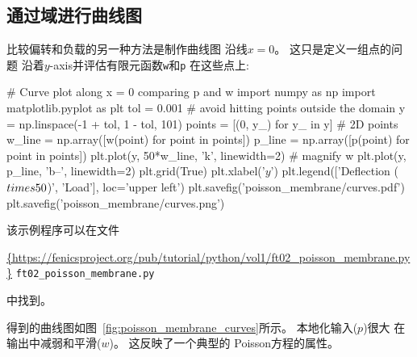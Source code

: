 \subsection{通过域进行曲线图}


比较偏转和负载的另一种方法是制作曲线图
沿线$x=0$。 这只是定义一组点的问题
沿着$y$-axis并评估有限元函数\texttt{w}和\texttt{p}
在这些点上:

\begin{python}
# Curve plot along x = 0 comparing p and w
import numpy as np
import matplotlib.pyplot as plt
tol = 0.001  # avoid hitting points outside the domain
y = np.linspace(-1 + tol, 1 - tol, 101)
points = [(0, y_) for y_ in y]  # 2D points
w_line = np.array([w(point) for point in points])
p_line = np.array([p(point) for point in points])
plt.plot(y, 50*w_line, 'k', linewidth=2)  # magnify w
plt.plot(y, p_line, 'b--', linewidth=2)
plt.grid(True)
plt.xlabel('$y$')
plt.legend(['Deflection ($\\times 50$)', 'Load'], loc='upper left')
plt.savefig('poisson_membrane/curves.pdf')
plt.savefig('poisson_membrane/curves.png')
\end{python}
该示例程序可以在文件
\begin{center}
  \url{{https://fenicsproject.org/pub/tutorial/python/vol1/ft02_poisson_membrane.py}} {\nolinkurl {ft02_poisson_membrane.py}}
\end{center}
中找到。

得到的曲线图如图~\ref{fig:poisson_membrane_curves}所示。 本地化输入($p$)很大
在输出中减弱和平滑($w$)。 这反映了一个典型的
Poisson方程的属性。

